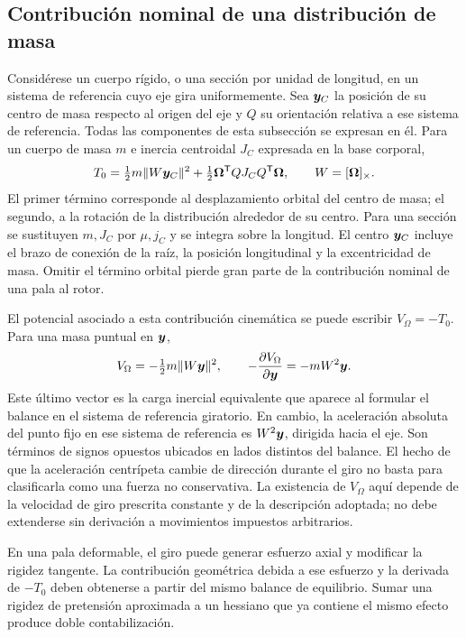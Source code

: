 \subsection{Contribución nominal de una distribución de masa}
Considérese un cuerpo rígido, o una sección por unidad de longitud, en un sistema de referencia cuyo eje gira uniformemente. Sea $\bm{y}_C$ la posición de su centro de masa respecto al origen del eje y $Q$ su orientación relativa a ese sistema de referencia. Todas las componentes de esta subsección se expresan en él. Para un cuerpo de masa $m$ e inercia centroidal $J_C$ expresada en la base corporal,
\begin{equation}
 T_0=\tfrac12m\|W\bm{y}_C\|^2
 +\tfrac12\bm{\Omega}^{\mathsf T}QJ_CQ^{\mathsf T}\bm{\Omega},
 \qquad W=[\bm{\Omega}]_\times.
 \label{eq:T0rigid}
\end{equation}
El primer término corresponde al desplazamiento orbital del centro de masa; el segundo, a la rotación de la distribución alrededor de su centro. Para una sección se sustituyen $m,J_C$ por $\mu,j_C$ y se integra sobre la longitud. El centro $\bm{y}_C$ incluye el brazo de conexión de la raíz, la posición longitudinal y la excentricidad de masa. Omitir el término orbital pierde gran parte de la contribución nominal de una pala al rotor.

El potencial asociado a esta contribución cinemática se puede escribir $V_\Omega=-T_0$. Para una masa puntual en $\bm{y}$,
\begin{equation}
 V_\Omega=-\tfrac12m\|W\bm{y}\|^2,
 \qquad -\frac{\partial V_\Omega}{\partial\bm{y}}
 =-mW^2\bm{y}.
\end{equation}
Este último vector es la carga inercial equivalente que aparece al formular el balance en el sistema de referencia giratorio. En cambio, la aceleración absoluta del punto fijo en ese sistema de referencia es $W^2\bm{y}$, dirigida hacia el eje. Son términos de signos opuestos ubicados en lados distintos del balance. El hecho de que la aceleración centrípeta cambie de dirección durante el giro no basta para clasificarla como una fuerza no conservativa. La existencia de $V_\Omega$ aquí depende de la velocidad de giro prescrita constante y de la descripción adoptada; no debe extenderse sin derivación a movimientos impuestos arbitrarios.

En una pala deformable, el giro puede generar esfuerzo axial y modificar la rigidez tangente. La contribución geométrica debida a ese esfuerzo y la derivada de $-T_0$ deben obtenerse a partir del mismo balance de equilibrio. Sumar una rigidez de pretensión aproximada a un hessiano que ya contiene el mismo efecto produce doble contabilización.

